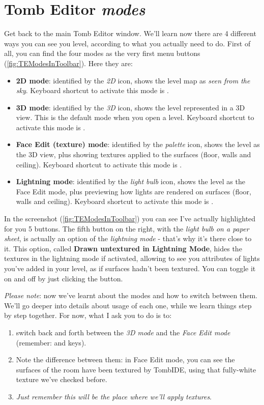 \chapter{Tomb Editor \emph{modes}}
Get back to the main Tomb Editor window. We'll learn now there are 4 different ways you can see you level, according to what you actually need to do.
First of all, you can find the four modes as the very first menu buttons (\ref{fig:TEModesInToolbar}).
Here they are:
\begin{itemize}
    \item \textbf{2D mode}: identified by the \emph{2D} icon, shows the level map as \emph{seen from the sky}. Keyboard shortcut to activate this mode is .
    \item \textbf{3D mode}: identified by the \emph{3D} icon, shows the level represented in a 3D view. This is the default mode when you open a level. Keyboard shortcut to activate this mode is .
    \item \textbf{Face Edit (texture) mode}: identified by the \emph{palette} icon, shows the level as the 3D view, plus showing textures applied to the surfaces (floor, walls and ceiling). Keyboard shortcut to activate this mode is .
    \item \textbf{Lightning mode}: identified by the \emph{light bulb} icon, shows the level as the Face Edit mode, plus previewing how lights are rendered on surfaces (floor, walls and ceiling). Keyboard shortcut to activate this mode is .
\end{itemize}

In the screenshot (\ref{fig:TEModesInToolbar}) you can see I've actually highlighted for you 5 buttons. The fifth button on the right, with the \emph{light bulb on a paper sheet}, is actually an option of the \emph{lightning mode} - that's why it's there close to it. This option, called \textbf{Drawn untextured in Lightning Mode}, hides the textures in the lightning mode if activated, allowing to see you attributes of lights you've added in your level, as if surfaces hadn't been textured. You can toggle it on and off by just clicking the button. %

\par \emph{Please note}: now we've learnt about the modes and how to switch between them. We'll go deeper into details about usage of each one, while we learn things step by step together. For now, what I ask you to do is to:
\begin{enumerate}
    \item switch back and forth between the \emph{3D mode} and the \emph{Face Edit mode} (remember:  and  keys).
    \item Note the difference between them: in Face Edit mode, you can see the surfaces of the room have been textured by TombIDE, using that fully-white texture we've checked before.
    \item \emph{Just remember this will be the place where we'll apply textures}.
\end{enumerate}

